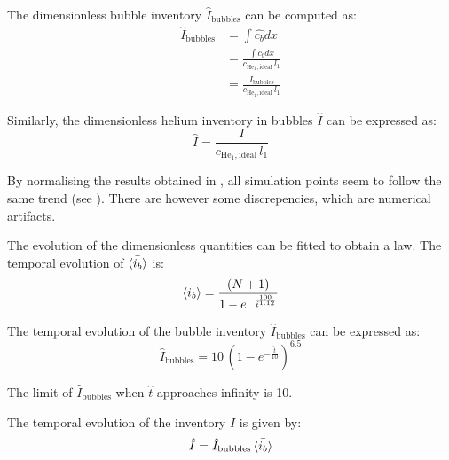 The dimensionless bubble inventory $\hat{I}_\mathrm{bubbles}$ can be computed as:
\begin{subequations}
    \begin{align}
        \hat{I}_\mathrm{bubbles} &= \int \hat{c_b} d\hat{x} \\
        &= \frac{ \int c_b dx}{c_{\mathrm{He}_1, \mathrm{ideal}} \, l_1} \\
        &= \frac{I_\mathrm{bubbles}}{c_{\mathrm{He}_1, \mathrm{ideal}} \, l_1} 
    \end{align}
\end{subequations}

Similarly, the dimensionless helium inventory in bubbles $\hat{I}$ can be expressed as:
\begin{equation}
    \hat{I} = \frac{I}{c_{\mathrm{He}_1, \mathrm{ideal}} \, l_1} 
\end{equation}

By normalising the results obtained in , all simulation points seem to follow the same trend (see ).
There are however some discrepencies, which are numerical artifacts.

The evolution of the dimensionless quantities can be fitted to obtain a law.
The temporal evolution of $\Bar{\langle i_b \rangle}$ is:
\begin{equation}
    \Bar{\langle i_b \rangle} = \frac{(N+1)}{1 - e^{-\frac{100}{\hat{t}^{1.12}}}}
\end{equation}

The temporal evolution of the bubble inventory $\hat{I}_\mathrm{bubbles}$ can be expressed as:
\begin{equation}
    \hat{I}_\mathrm{bubbles} = 10 \, (1 - e^{-\frac{\hat{t}}{10}})^{6.5}
\end{equation}

The limit of $\hat{I}_\mathrm{bubbles}$ when $\hat{t}$ approaches infinity is 10.

The temporal evolution of the inventory $\hat{I}$ is given by:
\begin{equation}
    \hat{I} = \hat{I}_\mathrm{bubbles} \, \Bar{\langle i_b \rangle}
\end{equation}

